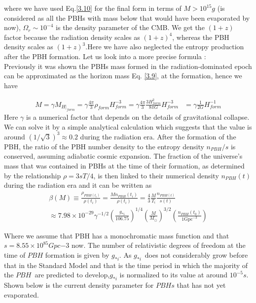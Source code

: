 where we have used Eq.\ref{3.10} for the final form in terms of $ M > 10^{15}g$ (is considered as all the PBHs with mass below that would have been evaporated by now), $\Omega_{r} \sim 10^{-4}$  is the density parameter of the CMB. We get the $(1+z)$ factor because the radiation density scales as $(1+z)^4$, whereas the PBH density scales as $(1+z)^3$.Here we have also neglected the entropy production after the PBH formation. Let us look into a more precise formula \cite{PhysRevD.81.104019}:\\
\hspace{0.5cm}Previously it was shown the PBHs mass formed in the radiation-dominated epoch can be approximated as the horizon mass Eq. \ref{3.9}, at the formation, hence we have

\begin{align}
    M = \gamma M_{H|_{form}} = \gamma\frac{4\pi}{3}\rho_{form} H_{form}^{-3} =  \gamma\frac{4\pi}{3}\frac{3H^2_{form}}{8\pi G}H_{form}^{-3} 
    &= \gamma\frac{1}{2G}H^{-1}_{form} \label{3.12}
\end{align}
Here $\gamma$ is a numerical factor that depends on the details of gravitational collapse. We can solve it by a simple analytical calculation \cite{1975ApJ...201....1C} which suggests that the value is around $(1/\sqrt{3})^3 \approx 0.2$ during the radiation era.
After the formation of the PBH, the ratio of the PBH number density to the entropy density $n_{PBH}/s $ is conserved, assuming adiabatic cosmic expansion. The fraction of the universe's mass that was contained in PBHs at the time of their formation, as determined by the relationship $\rho = 3sT/4$, is then linked to their numerical density $n_{PBH}(t)$ during the radiation era and it can be written as
\begin{multline}
    \beta(M) \equiv \frac{\rho_{PBH(t_i)}}{\rho(t_i)}=  \frac{M n_{PBH}\left(t_{i}\right)}{\rho\left(t_{i}\right)} = \frac{4}{3}\frac{M}{T_i}\frac{n_{PBH(t)}}{s(t)} \\
    \approx 7.98 \times 10^{-29} \gamma^{-1 / 2}\left(\frac{g_{*i }}{106.75}\right)^{1 / 4} \left(\frac{M}{M_{\odot}}\right)^{3 / 2}\left(\frac{n_{PBH}\left(t_0\right)}{1 \mathrm{Gpc}^{-3}}\right) \label{3.13}
\end{multline}
    

Where we  assume that PBH has a monochromatic mass function and that $s = 8.55 \times 10^{85} Gpc{-3}$ now. The number of relativistic degrees of freedom at the time of $PBH$ formation is given by $g_{*i}$. As $g_{*i}$ does not considerably grow before that in the Standard Model and that is the time period in which the majority of the $PBH$ are predicted to develop,$g_{*i}$ is normalized to its value at around $10^{-5} s$. Shown below is the current density parameter for $PBHs$ that has not yet evaporated.

